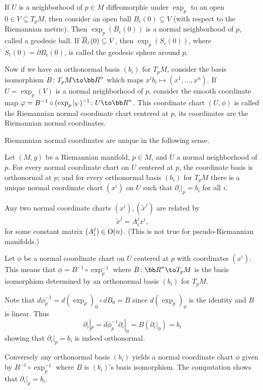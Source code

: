     If $U$ is a neighborhood of $p\in M$ diffeomorphic under $\exp_p$ to an open $0\in V\subseteq T_pM$, then
    consider an open ball $B_\epsilon(0)\subseteq V$ (with respect to the Riemannian metric).
    Then $\exp_p(B_\epsilon(0))$ is a normal neighborhood of $p$, called a {\emphcolor geodesic ball}.
    If $\overline B_\varepsilon(0)\subseteq V$, then $\exp_p(S_\epsilon(0))$, where $S_\epsilon(0)=\partial B_\epsilon(0)$,
    is called the {\emphcolor geodesic sphere} around $p$.

\edefn

Now if we have an orthonormal basis $(b_i)$ for $T_pM$, consider the basis isomorphism $B\colon T_pM\to\bR^n$
which maps $x^ib_i\mapsto(x^1,\dots,x^n)$.
If $U=\exp_p(V)$ is a normal neighborhood of $p$, consider the smooth coordinate map
$\phi=B^{-1}\circ(\exp_p|_V)^{-1}\colon U\to\bR^n$.
This coordinate chart $(U,\phi)$ is called the {\emphcolor Riemannian normal coordinate chart} centered at $p$,
its coordinates are the {\emphcolor Riemannian normal coordinates}.

Riemannian normal coordinates are unique in the following sense.

\bprop

    Let $(M,g)$ be a Riemannian manifold, $p\in M$, and $U$ a normal neighborhood of $p$.
    For every normal coordinate chart on $U$ centered at $p$, the coordinate basis is orthonormal at $p$;
    and for every orthonormal basis $(b_i)$ for $T_pM$ there is a unique normal coordinate chart $(x^i)$ on $U$
    such that $\partial_i|_p=b_i$ for all $i$.

    Any two normal coordinate charts $(x^i),(\tilde x^j)$ are related by
    $$ \tilde x^j = A^j_ix^i, $$
    for some constant matrix $(A^j_i)\in{\rm O}(n)$.
    (This is not true for pseudo-Riemannian manifolds.)

\eprop

\bproof

    Let $\phi$ be a normal coordinate chart on $U$ centered at $p$ with coordinates $(x^i)$.
    This means that $\phi=B^{-1}\circ\exp_p^{-1}$ where $B\colon\bR^n\to T_pM$ is the basis isomorphism determined by
    an orthonormal basis $(b_i)$ for $T_pM$.

    Note that $d\phi^{-1}_p=d(\exp_p)_0\circ dB_0=B$ since $d(\exp_p)_0$ is the identity and $B$ is linear.
    Thus
    $$ \partial_i|_p = d\phi^{-1}_p\partial_i|_0 = B(\partial_i|_0) = b_i $$
    showing that $\partial_i|_p=b_i$ is indeed orthonormal.

    Conversely any orthonormal basis $(b_i)$ yields a normal coordinate chart $\phi$ given by $B^{-1}\circ\exp_p^{-1}$
    where $B$ is $(b_i)$'s basis isomorphism.
    The computation shows that $\partial_i|_p=b_i$.

